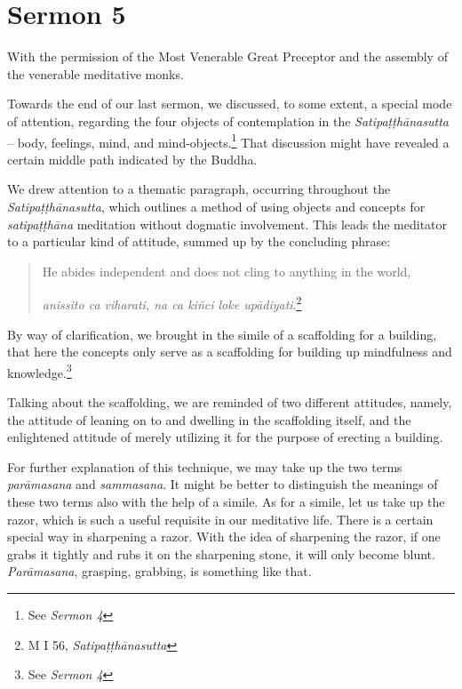 \chapter{Sermon 5}

\NibbanaOpeningQuote

With the permission of the Most Venerable Great Preceptor and the assembly of the venerable meditative monks.

Towards the end of our last sermon, we discussed, to some extent, a special mode of attention, regarding the four objects of contemplation in the \emph{Satipaṭṭhānasutta} -- body, feelings, mind, and mind-objects.\footnote{See \emph{Sermon 4}} That discussion might have revealed a certain middle path indicated by the Buddha.

We drew attention to a thematic paragraph, occurring throughout the \emph{Satipaṭṭhānasutta}, which outlines a method of using objects and concepts for \emph{satipaṭṭhāna} meditation without dogmatic involvement. This leads the meditator to a particular kind of attitude, summed up by the concluding phrase:

\enlargethispage{\baselineskip}

\begin{quote}
He abides independent and does not cling to anything in the world,

\emph{anissito ca viharati, na ca kiñci loke upādiyati}.\footnote{M I 56, \emph{Satipaṭṭhānasutta}}
\end{quote}

By way of clarification, we brought in the simile of a scaffolding for a building, that here the concepts only serve as a scaffolding for building up mindfulness and knowledge.\footnote{See \emph{Sermon 4}}

Talking about the scaffolding, we are reminded of two different attitudes, namely, the attitude of leaning on to and dwelling in the scaffolding itself, and the enlightened attitude of merely utilizing it for the purpose of erecting a building.

For further explanation of this technique, we may take up the two terms \emph{parāmasana} and \emph{sammasana}. It might be better to distinguish the meanings of these two terms also with the help of a simile. As for a simile, let us take up the razor, which is such a useful requisite in our meditative life. There is a certain special way in sharpening a razor. With the idea of sharpening the razor, if one grabs it tightly and rubs it on the sharpening stone, it will only become blunt. \emph{Parāmasana}, grasping, grabbing, is something like that.

